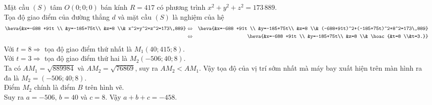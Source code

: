 \begin{ex}
{	Mặt cầu $(S)$ tâm $O(0;0;0)$ bán kính $R=417$ có phương trình $x^2+y^2+z^2=173\,889$.\\
	Tọa độ giao điểm của đường thẳng $d$ và mặt cầu $(S)$ là nghiệm của hệ 
	\begin{eqnarray*}
	\heva{&x=-688 +91t \\ &y=-185+75t\\ &z=8 \\& x^2+y^2+z^2=173\,889} 
	&\Leftrightarrow & 
	\heva{&x=-688 +91t \\ &y=-185+75t\\ &z=8 \\& (-688+91t)^2+(-185+75t)^2+8^2=173\,889} \\
	& \Leftrightarrow & 	\heva{&x=-688 +91t \\ &y=-185+75t\\ &z=8 \\& \hoac{&t=8 \\&t=3.}} 
	\end{eqnarray*}
	Với $t=8 \Rightarrow $ tọa độ giao điểm thứ nhất là $M_1 (40;415;8)$.\\
	Với $t=3 \Rightarrow $ tọa độ giao điểm thứ hai là $M_2 (-506; 40;8)$.\\
	Ta có $AM_1 = \sqrt{889984}$ và $AM_2 = \sqrt{76869}$, suy ra $AM_2 < AM_1$. Vậy tọa độ của vị trí sớm nhất mà máy bay xuất hiện trên màn hình ra đa là $M_2=(-506;40;8)$.\\
	Điểm $M_2$ chính là điểm $B$ trên hình vẽ.\\
	Suy ra $a=-506$, $b=40$ và $c=8$. Vậy $a+b+c=-458$.
	}
\end{ex}
